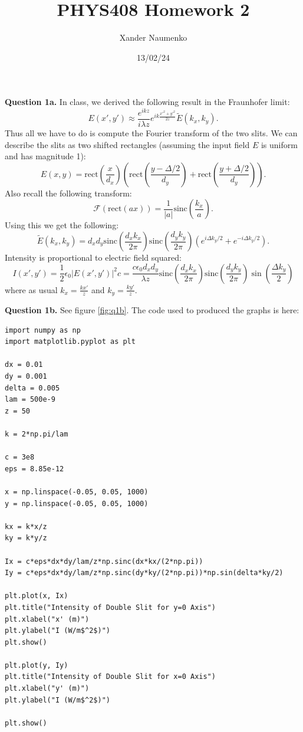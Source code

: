 \documentclass[letterpaper, reqno,11pt]{article}
\begin{document}
\title{PHYS408 Homework 2}
\date{13/02/24}
\author{Xander Naumenko}
\maketitle

{\medskip\noindent\bf Question 1a.} In class, we derived the following result in the Fraunhofer limit:
\[
    E(x',y')\approx \frac{e^{ikz}}{i\lambda z}e^{ik \frac{x'^2+y'^2}{2z}}\tilde E(k_x,k_y)
.\]
Thus all we have to do is compute the Fourier transform of the two slits. We can describe the slits as two shifted rectangles (assuming the input field $E$ is uniform and has magnitude 1):
\[
E(x,y) = \text{rect}\left(\frac{x}{d_x}\right)\left( \text{rect}\left( \frac{y-\Delta /2}{d_y} \right) +\text{rect}\left( \frac{y+\Delta /2}{d_y} \right)  \right) 
.\]
Also recall the following transform:
\[
    \mathcal F(\text{rect}(ax))=\frac{1}{|a|}\text{sinc}\left( \frac{k_x}{a} \right) 
.\]
Using this we get the following:
\[
    \tilde E(k_x, k_y) = d_xd_y \text{sinc}\left(\frac{d_xk_x}{2\pi}\right)\text{sinc}\left(\frac{d_yk_y}{2\pi}\right)\left( e^{i\Delta k_y /2}+e^{-i\Delta k_y /2} \right) 
.\]
Intensity is proportional to electric field squared:
\[
I(x',y') = \frac{1}{2}\epsilon_0 |E(x',y')|^2c=\frac{c\epsilon_0d_xd_y}{\lambda z} \text{sinc}\left(\frac{d_xk_x}{2\pi}\right)\text{sinc}\left(\frac{d_yk_y}{2\pi}\right)\sin\left( \frac{\Delta k_y}{2} \right) 
\]
where as usual $k_x= \frac{kx'}{z}$ and $k_y=\frac{ky'}{z}$.

{\medskip\noindent\bf Question 1b.} See figure \ref{fig:q1b}. The code used to produced the graphs is here:
\begin{lstlisting}
import numpy as np
import matplotlib.pyplot as plt

dx = 0.01
dy = 0.001
delta = 0.005
lam = 500e-9
z = 50

k = 2*np.pi/lam

c = 3e8
eps = 8.85e-12

x = np.linspace(-0.05, 0.05, 1000)
y = np.linspace(-0.05, 0.05, 1000)

kx = k*x/z
ky = k*y/z

Ix = c*eps*dx*dy/lam/z*np.sinc(dx*kx/(2*np.pi))
Iy = c*eps*dx*dy/lam/z*np.sinc(dy*ky/(2*np.pi))*np.sin(delta*ky/2)

plt.plot(x, Ix)
plt.title("Intensity of Double Slit for y=0 Axis")
plt.xlabel("x' (m)")
plt.ylabel("I (W/m$^2$)")
plt.show()

plt.plot(y, Iy)
plt.title("Intensity of Double Slit for x=0 Axis")
plt.xlabel("y' (m)")
plt.ylabel("I (W/m$^2$)")

plt.show()

\end{lstlisting}
\end{document}
